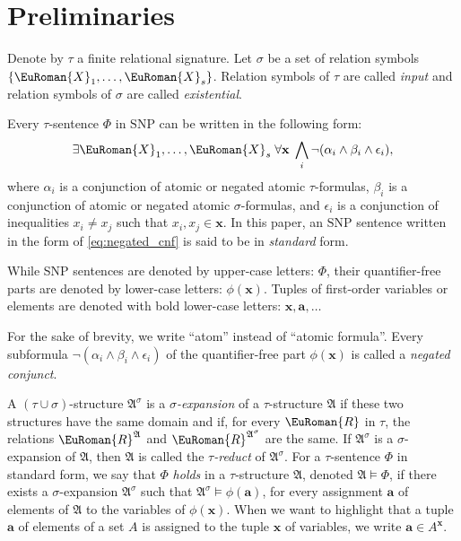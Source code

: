 \documentclass[10pt,a4paper]{amsart}
\theoremstyle{plain}
\theoremstyle{definition}
\numberwithin{equation}{section}
\newcommand{\eurm}[1]{\EuRoman{#1}} %
\newcommand{\structure}[1]{\mathfrak{#1}} %
\newcommand{\tuple}[1]{\mathbf{#1}} %
\newcommand{\rel}[1]{\eurm{#1}} %
\newcommand{\SNP}[0]{\textrm{SNP}}
\begin{document}
\section{Preliminaries}\label{section:preliminaries}


Denote by $\tau$ a finite relational signature.
%
Let $\sigma$ be a set of relation symbols $\{ \rel{X}_1,\ldots,  \rel{X}_s\}$.
%
Relation symbols of $\tau$ are called \emph{input} and relation symbols of $\sigma$ are called \emph{existential}. 
%

Every $\tau$-sentence $\Phi$ in $\SNP$ can be written in the following form:
\begin{equation}\label{eq:negated_cnf}
\exists \rel{X}_1,\ldots,  \rel{X}_s\;\forall\tuple{x} \; \bigwedge_i \neg (\alpha_i\wedge\beta_i\wedge \epsilon_i),
\end{equation}
where $\alpha_i$ is a conjunction of atomic or negated atomic $\tau$-formulas, $\beta_i$ is a conjunction of atomic or negated atomic $\sigma$-formulas, and $\epsilon_i$ is a conjunction of inequalities $x_i\not=x_j$ such that $x_i,x_j\in\tuple{x}$.
%
In this paper, an $\SNP$ sentence written in the form of \cref{eq:negated_cnf} is said to be in \emph{standard} form.

While SNP sentences are denoted by upper-case letters: $\Phi$, their quantifier-free parts are denoted by lower-case letters: $\phi(\tuple{x})$.
%
Tuples of first-order variables or elements are denoted with bold lower-case letters: $\tuple{x},\tuple{a},\dots$ 
%

For the sake of brevity, we write ``atom'' instead of ``atomic formula''.
Every subformula $\neg (\alpha_i\wedge\beta_i\wedge\epsilon_i)$ of the quantifier-free part $\phi(\tuple{x})$ is called a \emph{negated conjunct}.


A $(\tau\cup\sigma)$-structure $\structure{A}^\sigma$ is a \emph{$\sigma$-expansion} of a $\tau$-structure $\structure{A}$ if these two structures have the same domain and if, for every $\rel{R}$ in $\tau$, the relations $\rel{R}^{\structure{A}}$ and $\rel{R}^{\structure{A}^\sigma}$ are the same.
%
If $\structure{A}^\sigma$ is a $\sigma$-expansion of $\structure{A}$, then $\structure{A}$ is called the \emph{$\tau$-reduct} of $\structure{A}^\sigma$.
%
For a $\tau$-sentence $\Phi$ in standard form, we say that $\Phi$ \emph{holds} in a $\tau$-structure $\structure{A}$, denoted $\structure{A}\models\Phi$, if there exists a $\sigma$-expansion $\structure{A}^\sigma$ such that $\structure{A}^\sigma\models\phi(\tuple{a})$, for every assignment $\tuple{a}$ of elements of $\structure{A}$ to the variables of $\phi(\tuple{x})$.
%
When we want to highlight that a tuple $\tuple{a}$ of elements of a set $A$ is assigned to the tuple $\tuple{x}$ of variables, we write $\tuple{a}\in A^{\tuple{x}}$.
\end{document}
